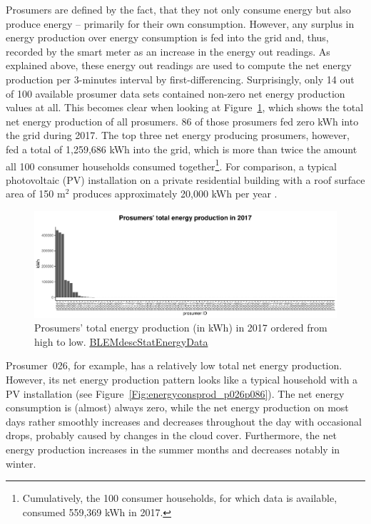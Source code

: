 Prosumers are defined by the fact, that they not only consume energy but also produce energy -- primarily for their own consumption. However, any surplus in energy production over energy consumption is fed into the grid and, thus, recorded by the smart meter as an increase in the energy out readings. As explained above, these energy out readings are used to compute the net energy production per 3-minutes interval by first-differencing. Surprisingly, only 14 out of 100 available prosumer data sets contained non-zero net energy production values at all. This becomes clear when looking at Figure~\ref{Fig:pros_total_production}, which shows the total net energy production of all prosumers. 86 of those prosumers fed zero kWh into the grid during 2017. The top three net energy producing prosumers, however, fed a total of 1,259,686 kWh into the grid, which is more than twice the amount all 100 consumer households consumed together\footnote{Cumulatively, the 100 consumer households, for which data is available, consumed 559,369 kWh in 2017.}. For comparison, a typical photovoltaic (PV) installation on a private residential building with a roof surface area of 150 m$^2$ produces approximately 20,000 kWh per year \citep{energieatlas:2018}.

\begin{figure}[htbp]
 \centering
\includegraphics[width=\textwidth]{thesis/graphs/prosumer_totalproduction.pdf}
\caption[Prosumers’ total energy production in 2017]{Prosumers’ total energy production (in kWh) in 2017 ordered from high to low. \quantnet\href{https://github.com/QuantLet/BLEM/tree/master/BLEMdescStatEnergyData}{BLEMdescStatEnergyData}}
\label{Fig:pros_total_production}
\end{figure}

Prosumer~026, for example, has a relatively low total net energy production. However, its net energy production pattern looks like a typical household with a PV installation (see Figure~\ref{Fig:energyconsprod_p026p086}). The net energy consumption is (almost) always zero, while the net energy production on most days rather smoothly increases and decreases throughout the day with occasional drops, probably caused by changes in the cloud cover. Furthermore, the net energy production increases in the summer months and decreases notably in winter.

